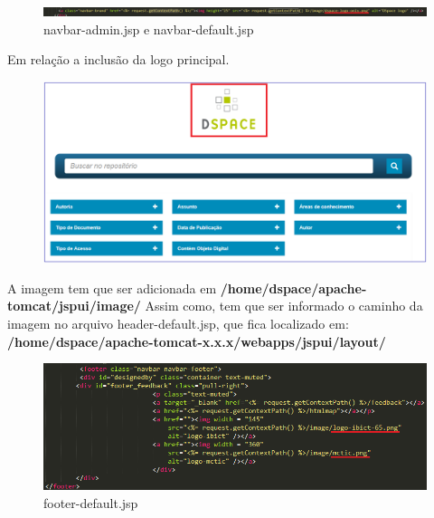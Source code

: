 \documentclass[12pt,hidelinks]{article}
\begin{document}
\begin{figure}[!htp]
        \centering
        \includegraphics[scale=0.3]{figura/dspace-logo-only2.png}
        \caption{navbar-admin.jsp e navbar-default.jsp}
        \label{Rotulo}
    \end{figure}

Em relação a inclusão da logo principal.
\begin{figure}[!htp]
        \centering
        \includegraphics[scale=0.5]{figura/logo-principal.png}
        \caption{}
        \label{Rotulo}
    \end{figure}
    
\newpage 
A imagem tem que ser adicionada em \textbf{/home/dspace/apache-tomcat/jspui/image/} 
Assim como, tem que ser informado o caminho da imagem no arquivo header-default.jsp, que fica localizado em:  \textbf{/home/dspace/apache-tomcat-x.x.x/webapps/jspui/layout/}
    \begin{figure}[!htp]
        \centering
        \includegraphics[scale=0.5]{figura/footer-default.png}
        \caption{footer-default.jsp}
        \label{Rotulo}
    \end{figure}
    
\end{document}
